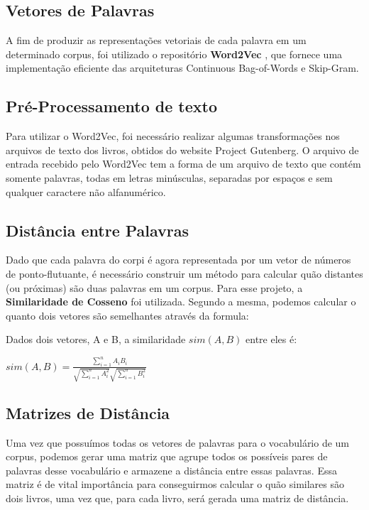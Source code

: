 \documentclass[12pt]{article}
\begin{document}
\subsection{Vetores de Palavras}

A fim de produzir as representações vetoriais de cada palavra em um determinado corpus,
foi utilizado o repositório \textbf{Word2Vec} \cite{word2vec}, que fornece uma implementação eficiente
das arquiteturas Continuous Bag-of-Words e Skip-Gram.

\subsection{Pré-Processamento de texto}

Para utilizar o Word2Vec, foi necessário realizar algumas transformações nos arquivos de texto
dos livros, obtidos do website Project Gutenberg. O arquivo de entrada recebido pelo Word2Vec
tem a forma de um arquivo de texto que contém somente palavras, todas em letras minúsculas,
separadas por espaços e sem qualquer caractere não alfanumérico.

\subsection{Distância entre Palavras}

Dado que cada palavra do corpi é agora representada por um vetor de números de ponto-flutuante,
é necessário construir um método para calcular quão distantes (ou próximas) são duas palavras em
um corpus. Para esse projeto, a \textbf{Similaridade de Cosseno} \cite{cosdist} foi utilizada. Segundo
a mesma, podemos calcular o quanto dois vetores são semelhantes através da formula:

Dados dois vetores, A e B, a similaridade $ sim(A, B) $ entre eles é:

\begin{center}
  $ sim(A, B) = \frac{\sum_{i=1}^{n} A_i B_i}{\sqrt{\sum_{i=1}^{n} A_i^2} \sqrt{\sum_{i=1}^{n} B_i^2}} $
\end{center}

\subsection{Matrizes de Distância}

Uma vez que possuímos todas os vetores de palavras para o vocabulário de um corpus, podemos gerar
uma matriz que agrupe todos os possíveis pares de palavras desse vocabulário e armazene a distância
entre essas palavras. Essa matriz é de vital importância para conseguirmos calcular o quão similares
são dois livros, uma vez que, para cada livro, será gerada uma matriz de distância. 
\end{document}
